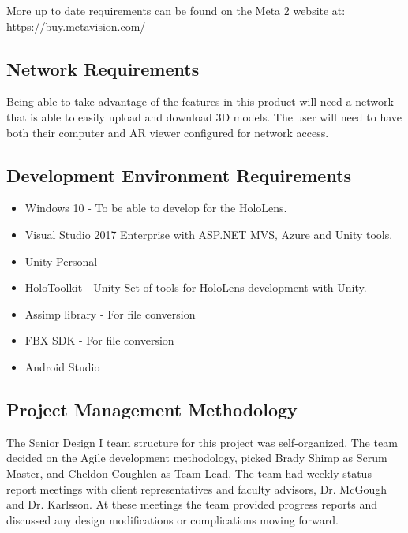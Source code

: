 More up to date requirements can be found on the Meta 2 website at: 
\url{https://buy.metavision.com/}

\subsection{Network Requirements}

Being able to take advantage of the features in this product will need a network
that is able to easily upload and download 3D models. The user will need to have
both their computer and AR viewer configured for network access.

\subsection{Development Environment Requirements}
\begin{itemize}
	\item Windows 10 - To be able to develop for the HoloLens.
	\item Visual Studio 2017 Enterprise with ASP.NET MVS, Azure and Unity tools.
	\item Unity Personal
	\item HoloToolkit - Unity Set of tools for HoloLens development with Unity.
	\item Assimp library - For file conversion
	\item FBX SDK - For file conversion
	\item Android Studio
\end{itemize}


\subsection{Project Management Methodology}

The Senior Design I team structure for this project was self-organized. The team decided on the Agile development methodology, picked Brady Shimp as Scrum Master, and Cheldon Coughlen as Team Lead. The team had weekly status report meetings with client representatives and faculty advisors, Dr. McGough and Dr. Karlsson. At these meetings the team provided progress reports and discussed any design modifications or complications moving forward.\\

